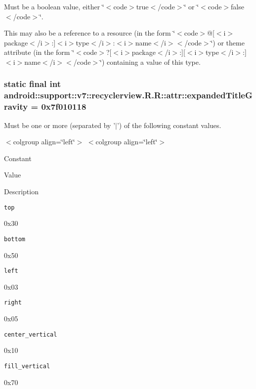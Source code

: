 Must be a boolean value, either \char`\"{}$<$code$>$true$<$/code$>$\char`\"{} or \char`\"{}$<$code$>$false$<$/code$>$\char`\"{}. 

This may also be a reference to a resource (in the form \char`\"{}$<$code$>$@\mbox{[}$<$i$>$package$<$/i$>$:\mbox{]}$<$i$>$type$<$/i$>$:$<$i$>$name$<$/i$>$$<$/code$>$\char`\"{}) or theme attribute (in the form \char`\"{}$<$code$>$?\mbox{[}$<$i$>$package$<$/i$>$:\mbox{]}\mbox{[}$<$i$>$type$<$/i$>$:\mbox{]}$<$i$>$name$<$/i$>$$<$/code$>$\char`\"{}) containing a value of this type. \hypertarget{classandroid_1_1support_1_1v7_1_1recyclerview_1_1_r_1_1attr_fbbb2d9857c0129cf8f68a6f55a3680a}{
\subsubsection[{expandedTitleGravity}]{\setlength{\rightskip}{0pt plus 5cm}static final int android::support::v7::recyclerview.R.R::attr::expandedTitleGravity = 0x7f010118}}
\label{classandroid_1_1support_1_1v7_1_1recyclerview_1_1_r_1_1attr_fbbb2d9857c0129cf8f68a6f55a3680a}


Must be one or more (separated by '$|$') of the following constant values. \begin{TabularC}{0}
\hline
\end{TabularC}
$<$colgroup align=\char`\"{}left\char`\"{}$>$ $<$colgroup align=\char`\"{}left\char`\"{}$>$ 

Constant

Value

Description 

{\tt top}

0x30

{\tt bottom}

0x50

{\tt left}

0x03

{\tt right}

0x05

{\tt center\_\-vertical}

0x10

{\tt fill\_\-vertical}

0x70

